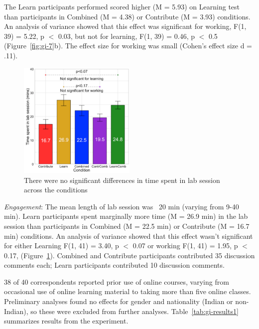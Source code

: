 The Learn participants performed scored higher (M = 5.93) on Learning test than participants in Combined (M = 4.38) or Contribute (M = 3.93) conditions. An analysis of variance showed that this effect was significant for working, F(1, 39) = 5.22, p $<$ 0.03, but not for learning, F(1, 39) = 0.46, p $<$ 0.5 (Figure~\ref{fig:gi-7}b). The effect size for working was small (Cohen’s effect size d = .11).

\begin{figure}[h] 
  \centering
  \includegraphics[width=0.5\textwidth]{figures/gutinstinct/gi-7-1.png}
  \caption[Results: Time spent]
{There were no significant differences in time spent in lab session across the conditions }
  \label{fig:gi-7-1}
\end{figure}

\textit{Engagement}: The mean length of lab session was ~20 min (varying from 9-40 min). Learn participants spent marginally more time (M = 26.9 min) in the lab session than participants in Combined (M = 22.5 min) or Contribute (M = 16.7 min) conditions. An analysis of variance showed that this effect wasn’t significant for either Learning F(1, 41) = 3.40, p $<$ 0.07 or working F(1, 41) = 1.95, p $<$ 0.17, (Figure~\ref{fig:gi-7-1}). Combined and Contribute participants contributed 35 discussion comments each; Learn participants contributed 10 discussion comments.

38 of 40 correspondents reported prior use of online courses, varying from occasional use of online learning material to taking more than five online classes. Preliminary analyses found no effects for gender and nationality (Indian or non-Indian), so these were excluded from further analyses. Table~\ref{tab:gi-results1} summarizes results from the experiment. 

